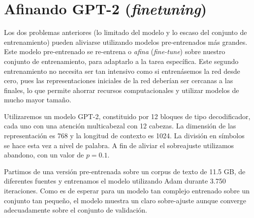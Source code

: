 \section{Afinando GPT-2 (\textit{finetuning})}
Los dos problemas anteriores (lo limitado del modelo y lo escaso del conjunto de entrenamiento) pueden aliviarse utilizando modelos pre-entrenados más grandes. Este modelo pre-entrenado se re-entrena o \textit{afina} (\textit{fine-tune}) sobre nuestro conjunto de entrenamiento, para adaptarlo a la tarea específica. Este segundo entrenamiento no necesita ser tan intensivo como si entrenásemos la red desde cero, pues las representaciones iniciales de la red deberían ser cercanas a las finales, lo que permite ahorrar recursos computacionales y utilizar modelos de mucho mayor tamaño.

Utilizaremos un modelo GPT-2, constituido por 12 bloques de tipo decodificador, cada uno con una atención multicabezal con 12 cabezas. La dimensión de las representación es 768 y la longitud de contexto es 1024. La división en símbolos se hace esta vez a nivel de palabra. A fin de aliviar el sobreajuste utilizamos abandono, con un valor de \( p = 0.1 \).

Partimos de una versión pre-entrenada sobre un corpus de texto de 11.5 GB, de diferentes fuentes\cite{gpt2trained} y entrenamos el modelo utilizando Adam durante 3.750 iteraciones. Como es de esperar para un modelo tan complejo entrenado sobre un conjunto tan pequeño, el modelo muestra un claro sobre-ajuste aunque converge adecuadamente sobre el conjunto de validación.

